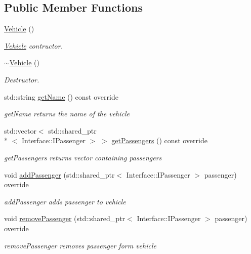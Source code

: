 \subsection*{Public Member Functions}
\begin{DoxyCompactItemize}
\item 
\hyperlink{class_student_side_1_1_vehicle_a0c1ae4b0988ff51bb4ac8f3064e9eb4c}{Vehicle} ()
\begin{DoxyCompactList}\small\item\em \hyperlink{class_student_side_1_1_vehicle}{Vehicle} contructor. \end{DoxyCompactList}\item 
\hyperlink{class_student_side_1_1_vehicle_a3f7640989e79392692aa0cedaa0e4328}{$\sim$\-Vehicle} ()
\begin{DoxyCompactList}\small\item\em Destructor. \end{DoxyCompactList}\item 
std\-::string \hyperlink{class_student_side_1_1_vehicle_afc51d4f1db2c7846f471eba5b03c1d19}{get\-Name} () const override
\begin{DoxyCompactList}\small\item\em get\-Name returns the name of the vehicle \end{DoxyCompactList}\item 
std\-::vector$<$ std\-::shared\-\_\-ptr\\*
$<$ Interface\-::\-I\-Passenger $>$ $>$ \hyperlink{class_student_side_1_1_vehicle_a24c2cece6d5d46979fe9a842d72b06ed}{get\-Passengers} () const override
\begin{DoxyCompactList}\small\item\em get\-Passengers returns vector containing passengers \end{DoxyCompactList}\item 
void \hyperlink{class_student_side_1_1_vehicle_adb754d632a1cfd913adb2fb5862bf376}{add\-Passenger} (std\-::shared\-\_\-ptr$<$ Interface\-::\-I\-Passenger $>$ passenger) override
\begin{DoxyCompactList}\small\item\em add\-Passenger adds passenger to vehicle \end{DoxyCompactList}\item 
void \hyperlink{class_student_side_1_1_vehicle_a6373888a6965dbdb880d8513f9706d60}{remove\-Passenger} (std\-::shared\-\_\-ptr$<$ Interface\-::\-I\-Passenger $>$ passenger) override
\begin{DoxyCompactList}\small\item\em remove\-Passenger removes passenger form vehicle \end{DoxyCompactList}\end{DoxyCompactItemize}


